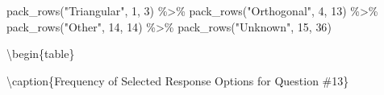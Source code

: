 \documentclass[
  letterpaper,
  DIV=11,
  numbers=noendperiod]{scrreprt}
\newenvironment{Shaded}{\begin{snugshade}}{\end{snugshade}}
\newcommand{\DecValTok}[1]{\textcolor[rgb]{0.68,0.00,0.00}{#1}}
\newcommand{\FunctionTok}[1]{\textcolor[rgb]{0.28,0.35,0.67}{#1}}
\newcommand{\NormalTok}[1]{\textcolor[rgb]{0.00,0.23,0.31}{#1}}
\newcommand{\SpecialCharTok}[1]{\textcolor[rgb]{0.37,0.37,0.37}{#1}}
\newcommand{\StringTok}[1]{\textcolor[rgb]{0.13,0.47,0.30}{#1}}
\begin{document}
\begin{Shaded}
\begin{Highlighting}[]
  \FunctionTok{pack\_rows}\NormalTok{(}\StringTok{"Triangular"}\NormalTok{, }\DecValTok{1}\NormalTok{, }\DecValTok{3}\NormalTok{) }\SpecialCharTok{\%\textgreater{}\%}
  \FunctionTok{pack\_rows}\NormalTok{(}\StringTok{"Orthogonal"}\NormalTok{, }\DecValTok{4}\NormalTok{, }\DecValTok{13}\NormalTok{) }\SpecialCharTok{\%\textgreater{}\%}
  \FunctionTok{pack\_rows}\NormalTok{(}\StringTok{"Other"}\NormalTok{, }\DecValTok{14}\NormalTok{, }\DecValTok{14}\NormalTok{) }\SpecialCharTok{\%\textgreater{}\%}
  \FunctionTok{pack\_rows}\NormalTok{(}\StringTok{"Unknown"}\NormalTok{, }\DecValTok{15}\NormalTok{, }\DecValTok{36}\NormalTok{)}
\end{Highlighting}
\end{Shaded}

\textbackslash begin\{table\}

\textbackslash caption\{\label{tab:Q13-RESPONSES}Frequency of Selected
Response Options for Question \#13\} \centering
\end{document}
